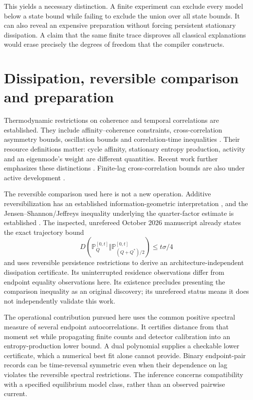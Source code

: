This yields a necessary distinction. A finite experiment can exclude every
model below a state bound while failing to exclude the union over all state
bounds. It can also reveal an expensive preparation without forcing persistent
stationary dissipation. A claim that the same finite trace disproves all
classical explanations would erase precisely the degrees of freedom that the
compiler constructs.

\section{Dissipation, reversible comparison and preparation}

Thermodynamic restrictions on coherence and temporal correlations are
established. They include affinity--coherence constraints, cross-correlation
asymmetry bounds, oscillation bounds and correlation-time inequalities
\cite{rfBarato2017,rfOhga2023,rfShiraishi2023,rfDechant2023,rfKolchinsky2024}.
Their resource definitions matter: cycle affinity, stationary entropy
production, activity and an eigenmode's weight are different quantities.
Recent work further emphasizes these distinctions
\cite{rfGu2026,rfShiraishi2026}. Finite-lag cross-correlation bounds are also
under active development \cite{rfRaux2026}.

The reversible comparison used here is not a new operation. Additive
reversibilization has an established information-geometric interpretation
\cite{rfChoi2024}, and the Jensen--Shannon/Jeffreys inequality underlying the
quarter-factor estimate is established \cite{rfCrooks2011}. The inspected,
unrefereed October 2026 manuscript \cite{rfHidden2026} already states the exact
trajectory bound
\[
 D(\mathbb P_Q^{[0,t]}\Vert\mathbb P_{(Q+Q^*)/2}^{[0,t]})
 \le t\sigma/4
\]
and uses reversible persistence restrictions to derive an
architecture-independent dissipation certificate. Its uninterrupted residence
observations differ from endpoint equality observations here. Its existence
precludes presenting the comparison inequality as an original discovery;
its unrefereed status means it does not independently validate this work.

The operational contribution pursued here uses the common positive spectral
measure of several endpoint autocorrelations. It certifies distance from that
moment set while propagating finite counts and detector calibration into an
entropy-production lower bound. A dual polynomial supplies a checkable lower
certificate, which a numerical best fit alone cannot provide. Binary
endpoint-pair records can be time-reversal symmetric even when their dependence
on lag violates the reversible spectral restrictions. The inference concerns
compatibility with a specified equilibrium model class, rather than an observed
pairwise current.

